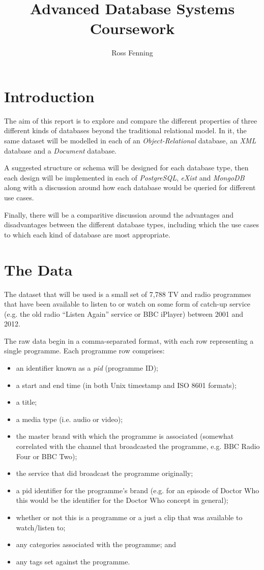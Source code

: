 \documentclass[11pt,a4paper]{article}
\title{Advanced Database Systems Coursework}
\author{Ross Fenning}
\begin{document}
\maketitle

\section{Introduction}

The aim of this report is to explore and compare the different properties of
three different kinds of databases beyond the traditional relational model. In it,
the same dataset will be modelled in each of an \emph{Object-Relational} database,
an \emph{XML} database and a \emph{Document} database.

A suggested structure or schema will be designed for each database type, then
each design will be implemented in each of \emph{PostgreSQL}, \emph{eXist}
and \emph{MongoDB} along with a discussion around how each database would be
queried for different use cases.

Finally, there will be a comparitive discussion around the advantages and
disadvantages between the different database types, including which the use
cases to which each kind of database are most appropriate.

\section{The Data}

The dataset that will be used is a small set of 7,788 TV and radio programmes
that have been available to listen to or watch on some form of catch-up
service (e.g. the old radio ``Listen Again'' service or BBC iPlayer) between
2001 and 2012.

The raw data begin in a comma-separated format, with each row representing
a single programme. Each programme row comprises:

\begin{itemize}
    \item an identifier known as a \emph{pid} (programme ID);
    \item a start and end time (in both Unix timestamp and ISO 8601 formats);
    \item a title;
    \item a media type (i.e. audio or video);
    \item the master brand with which the programme is associated (somewhat
      correlated with the channel that broadcasted the programme, e.g.
      BBC Radio Four or BBC Two);
    \item the service that did broadcast the programme originally;
    \item a pid identifier for the programme's brand (e.g. for an episode of
      Doctor Who this would be the identifier for the Doctor Who concept
      in general);
    \item whether or not this is a programme or a just a clip that was
      available to watch/listen to;
    \item any categories associated with the programme; and
    \item any tags set against the programme.
\end{itemize}
\end{document}
